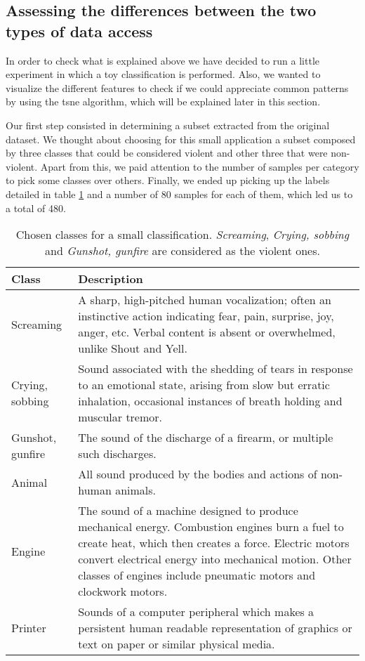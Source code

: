 	
\subsection{Assessing the differences between the two types of data access}
\label{subsection:exploring-differences-between-two-types-of-data-access}

	In order to check what is explained above we have decided to run a little experiment in which a toy classification is performed. Also, we wanted to visualize the different features to check if we could appreciate common patterns by using the \acrfull{tsne} algorithm, which will be explained later in this section.
	
	Our first step consisted in determining a subset extracted from the original dataset. We thought about choosing for this small application a subset composed by three classes that could be considered violent and other three that were non-violent. Apart from this, we paid attention to the number of samples per category to pick some classes over others. Finally, we ended up picking up the labels detailed in table \ref{table:4} and a number of 80 samples for each of them, which led us to a total of 480.
	
	\begin{table}[h]
	\begin{center}
		\begin{tabular}{||m{7em} | m{23em} ||}
			\hline
			\textbf{Class} & \textbf{Description} \\
			\hline\hline
			Screaming & A sharp, high-pitched human vocalization; often an instinctive action indicating fear, pain, surprise, joy, anger, etc. Verbal content is absent or overwhelmed, unlike Shout and Yell. \\
			\hline
			Crying, sobbing & Sound associated with the shedding of tears in response to an emotional state, arising from slow but erratic inhalation, occasional instances of breath holding and muscular tremor. \\
			\hline
			Gunshot, gunfire & The sound of the discharge of a firearm, or multiple such discharges. \\
			\hline
			Animal & All sound produced by the bodies and actions of non-human animals. \\
			\hline
			Engine & The sound of a machine designed to produce mechanical energy. Combustion engines burn a fuel to create heat, which then creates a force. Electric motors convert electrical energy into mechanical motion. Other classes of engines include pneumatic motors and clockwork motors. \\
			\hline
			Printer & Sounds of a computer peripheral which makes a persistent human readable representation of graphics or text on paper or similar physical media. \\
			\hline
		\end{tabular}
	\end{center}
	\caption{Chosen classes for a small classification. \textit{Screaming}, \textit{Crying, sobbing} and \textit{Gunshot, gunfire} are considered as the violent ones.}
	\label{table:4}
	\end{table}
	
